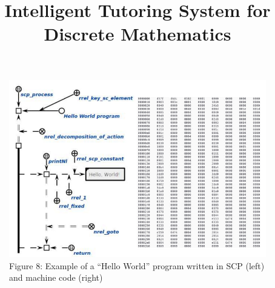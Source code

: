 \documentclass{article}
\title{\textbf{Intelligent Tutoring System
for Discrete Mathematics}}
\begin{document}
\normalsize

\begin{center}
\begin{figure}
    \centering
    \includegraphics[width=17cm]{picture_for_laba1pivas.jpg}
    \captionsetup
    \caption{Figure 8: Example of a “Hello World” program written in SCP (left) and machine code (right)}
\end{figure}
\end{center}
\end{document}
